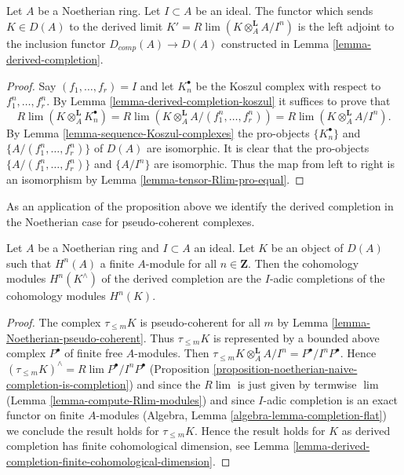 \begin{proposition}
\label{proposition-noetherian-naive-completion-is-completion}
Let $A$ be a Noetherian ring. Let $I \subset A$ be an ideal.
The functor which sends $K \in D(A)$ to the derived limit
$K' = R\lim( K \otimes_A^\mathbf{L} A/I^n )$ is the left
adjoint to the inclusion functor $D_{comp}(A) \to D(A)$
constructed in Lemma \ref{lemma-derived-completion}.
\end{proposition}

\begin{proof}
Say $(f_1, \ldots, f_r) = I$ and let $K_n^\bullet$ be the Koszul complex
with respect to $f_1^n, \ldots, f_r^n$. By
Lemma \ref{lemma-derived-completion-koszul}
it suffices to prove that
$$
R\lim (K \otimes_A^\mathbf{L} K_n^\bullet) =
R\lim (K \otimes_A^\mathbf{L} A/(f_1^n, \ldots, f_r^n) ) =
R\lim (K \otimes_A^\mathbf{L} A/I^n ).
$$
By Lemma \ref{lemma-sequence-Koszul-complexes} the pro-objects
$\{K_n^\bullet\}$ and $\{A/(f_1^n, \ldots, f_r^n)\}$ of $D(A)$ are
isomorphic. It is clear that the pro-objects
$\{A/(f_1^n, \ldots, f_r^n)\}$ and $\{A/I^n\}$ are isomorphic.
Thus the map from left to right is an isomorphism by
Lemma \ref{lemma-tensor-Rlim-pro-equal}.
\end{proof}

\noindent
As an application of the proposition above we identify the derived
completion in the Noetherian case for pseudo-coherent complexes.

\begin{lemma}
\label{lemma-derived-completion-pseudo-coherent}
Let $A$ be a Noetherian ring and $I \subset A$ an ideal. Let $K$ be an
object of $D(A)$ such that $H^n(A)$ a finite $A$-module for all
$n \in \mathbf{Z}$. Then the cohomology modules $H^n(K^\wedge)$ of
the derived completion are the $I$-adic
completions of the cohomology modules $H^n(K)$.
\end{lemma}

\begin{proof}
The complex $\tau_{\leq m}K$ is pseudo-coherent for all $m$
by Lemma \ref{lemma-Noetherian-pseudo-coherent}.
Thus $\tau_{\leq m}K$ is represented by a bounded above complex
$P^\bullet$ of finite free $A$-modules. Then
$\tau_{\leq m}K \otimes_A^\mathbf{L} A/I^n = P^\bullet/I^nP^\bullet$.
Hence $(\tau_{\leq m}K)^\wedge = R\lim P^\bullet/I^nP^\bullet$
(Proposition \ref{proposition-noetherian-naive-completion-is-completion})
and since the $R\lim$ is just given by termwise $\lim$
(Lemma \ref{lemma-compute-Rlim-modules}) and since
$I$-adic completion is an exact functor on finite $A$-modules
(Algebra, Lemma \ref{algebra-lemma-completion-flat}) we conclude
the result holds for $\tau_{\leq m}K$. Hence the result holds for
$K$ as derived completion has finite cohomological dimension, see
Lemma \ref{lemma-derived-completion-finite-cohomological-dimension}.
\end{proof}

